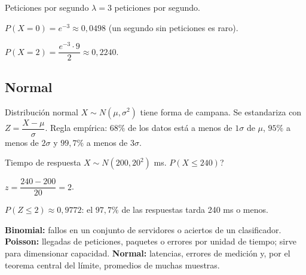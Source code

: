 \begin{tmejemplo}{Peticiones por segundo}
$\lambda=3$ peticiones por segundo.
\begin{tmpasos}
\item $P(X=0)=e^{-3}\approx0{,}0498$ (un segundo sin peticiones es raro).
\item $P(X=2)=\dfrac{e^{-3}\cdot9}{2}\approx0{,}2240$.
\end{tmpasos}
\end{tmejemplo}

\subsection{Normal}
\begin{tmdef}{Distribuci\'on normal}
$X\sim N(\mu,\sigma^2)$ tiene forma de campana. Se estandariza con $Z=\dfrac{X-\mu}{\sigma}$. Regla emp\'irica: $68\%$ de los datos est\'a a menos de $1\sigma$ de $\mu$, $95\%$ a menos de $2\sigma$ y $99{,}7\%$ a menos de $3\sigma$.
\end{tmdef}

\begin{center}
\end{center}

\begin{tmejemplo}{Tiempo de respuesta}
$X\sim N(200, 20^2)$ ms. \textquestiondown $P(X\le240)$?
\begin{tmpasos}
\item $z=\dfrac{240-200}{20}=2$.
\item $P(Z\le2)\approx0{,}9772$: el $97{,}7\%$ de las respuestas tarda 240 ms o menos.
\end{tmpasos}
\end{tmejemplo}

\begin{tmsistemas}
\textbf{Binomial:} fallos en un conjunto de servidores o aciertos de un clasificador. \textbf{Poisson:} llegadas de peticiones, paquetes o errores por unidad de tiempo; sirve para dimensionar capacidad. \textbf{Normal:} latencias, errores de medici\'on y, por el teorema central del l\'imite, promedios de muchas muestras.
\end{tmsistemas}

